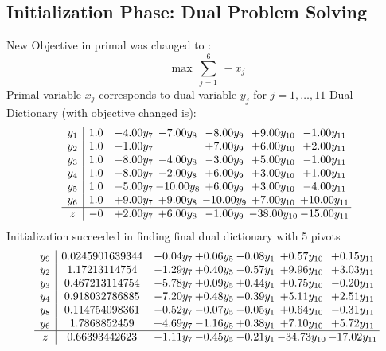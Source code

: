 \documentclass[8pt]{article}
\begin{document}
\subsection{Initialization Phase: Dual Problem Solving}
New Objective in primal was changed to : \[ \max\ \sum_{j=1}^{6}\ - x_j \] 
Primal variable $x_j$ corresponds to dual variable $y_j$ for $j = 1,\ldots,11$
Dual Dictionary (with objective changed is): 
\[\begin{array}{c| c c@{\hskip 2pt} c@{\hskip 2pt} c@{\hskip 2pt} c@{\hskip 2pt} c@{\hskip 2pt} }
 y_{1}   &  1.0 & -4.00 y_{7} & -7.00 y_{8} & -8.00 y_{9} & +  9.00 y_{10} & -1.00 y_{11}\\
 y_{2}   &  1.0 & -1.00 y_{7} &   & +  7.00 y_{9} & +  6.00 y_{10} & +  2.00 y_{11}\\
 y_{3}   &  1.0 & -8.00 y_{7} & -4.00 y_{8} & -3.00 y_{9} & +  5.00 y_{10} & -1.00 y_{11}\\
 y_{4}   &  1.0 & -8.00 y_{7} & -2.00 y_{8} & +  6.00 y_{9} & +  3.00 y_{10} & +  1.00 y_{11}\\
 y_{5}   &  1.0 & -5.00 y_{7} & -10.00 y_{8} & +  6.00 y_{9} & +  3.00 y_{10} & -4.00 y_{11}\\
 y_{6}   &  1.0 & +  9.00 y_{7} & +  9.00 y_{8} & -10.00 y_{9} & +  7.00 y_{10} & + 10.00 y_{11}\\
\hline
z    &  -0 & +  2.00 y_{7} & +  6.00 y_{8} & -1.00 y_{9} & -38.00 y_{10} & -15.00 y_{11}\\
\end{array}\]
Initialization succeeded in finding final dual dictionary with 5 pivots
\[\begin{array}{c| c c@{\hskip 2pt} c@{\hskip 2pt} c@{\hskip 2pt} c@{\hskip 2pt} c@{\hskip 2pt} }
 y_{9}   &  0.0245901639344 & -0.04 y_{7} & +  0.06 y_{5} & -0.08 y_{1} & +  0.57 y_{10} & +  0.15 y_{11}\\
 y_{2}   &  1.17213114754 & -1.29 y_{7} & +  0.40 y_{5} & -0.57 y_{1} & +  9.96 y_{10} & +  3.03 y_{11}\\
 y_{3}   &  0.467213114754 & -5.78 y_{7} & +  0.09 y_{5} & +  0.44 y_{1} & +  0.75 y_{10} & -0.20 y_{11}\\
 y_{4}   &  0.918032786885 & -7.20 y_{7} & +  0.48 y_{5} & -0.39 y_{1} & +  5.11 y_{10} & +  2.51 y_{11}\\
 y_{8}   &  0.114754098361 & -0.52 y_{7} & -0.07 y_{5} & -0.05 y_{1} & +  0.64 y_{10} & -0.31 y_{11}\\
 y_{6}   &  1.7868852459 & +  4.69 y_{7} & -1.16 y_{5} & +  0.38 y_{1} & +  7.10 y_{10} & +  5.72 y_{11}\\
\hline
z    &  0.66393442623 & -1.11 y_{7} & -0.45 y_{5} & -0.21 y_{1} & -34.73 y_{10} & -17.02 y_{11}\\
\end{array}\]
\end{document}
